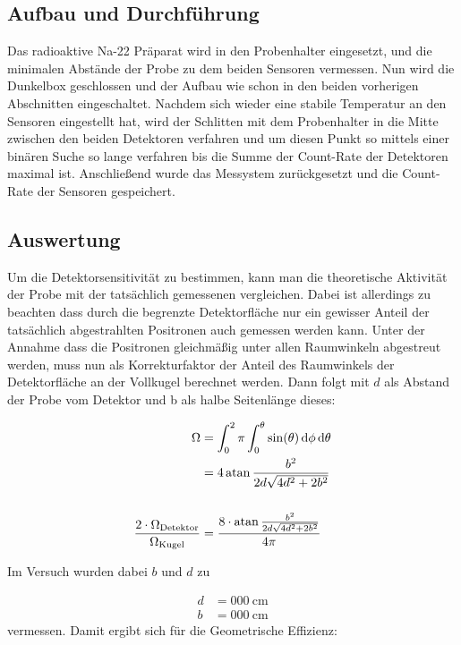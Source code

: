\documentclass[12pt,twoside,a4paper]{scrartcl}
\begin{document}
		\subsection{Aufbau und Durchführung}

			Das radioaktive Na-22 Präparat wird in den Probenhalter eingesetzt, und die minimalen Abstände der Probe zu dem beiden Sensoren vermessen. Nun wird die Dunkelbox geschlossen und der Aufbau wie schon in den beiden vorherigen Abschnitten eingeschaltet. Nachdem sich wieder eine stabile Temperatur an den Sensoren eingestellt hat, wird der Schlitten mit dem Probenhalter in die Mitte zwischen den beiden Detektoren verfahren und um diesen Punkt so mittels einer binären Suche so lange verfahren bis die Summe der Count-Rate der Detektoren maximal ist. Anschließend wurde das Messystem zurückgesetzt und die Count-Rate der Sensoren gespeichert.

		\subsection{Auswertung}

			Um die Detektorsensitivität zu bestimmen, kann man die theoretische Aktivität der Probe mit der tatsächlich gemessenen vergleichen.
			Dabei ist allerdings zu beachten dass durch die begrenzte Detektorfläche nur ein gewisser Anteil der tatsächlich abgestrahlten Positronen auch gemessen werden kann.
			Unter der Annahme dass die Positronen gleichmäßig unter allen Raumwinkeln abgestreut werden, muss nun als Korrekturfaktor der Anteil des Raumwinkels der Detektorfläche an der Vollkugel berechnet werden. Dann folgt mit $d$ als Abstand der Probe vom Detektor und b als halbe Seitenlänge dieses:

			\begin{align*}
				\Omega &= \int_0^2\pi \int_0^\theta \sin(\theta) \dd{\phi} \dd{\theta}\\
							 &= 4 \atan{ \frac{b^2}{2d \sqrt{4d^2 + 2b^2}}} \\
				\\
				\frac{2 \cdot \Omega_{\text{Detektor}}}{\Omega_{\text{Kugel}}} &=  \frac{8 \cdot \atan{\frac{b^2}{2d\sqrt{4d^2 + 2b^2}}}}{4 \pi}
			\end{align*}

			Im Versuch wurden dabei $b$ und $d$ zu

			\begin{align*}
					d &= \SI{000}{\centi \metre} \\
					b &= \SI{000}{\centi \metre}
			\end{align*}
			vermessen. Damit ergibt sich für die Geometrische Effizienz:
\end{document}
